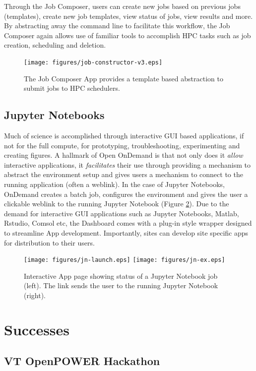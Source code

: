 \documentclass[runningheads]{llncs}
\begin{document}
\noindent Through the Job Composer, users can create new jobs based on previous jobs (templates), create new job templates, view status of jobs, view results and more.  By abstracting away the command line to facilitate this workflow, the Job Composer again allows use of familiar tools to accomplish HPC tasks such as job creation, scheduling and deletion.

\begin{figure}[H]
\centering 
\texttt{[image: figures/job-constructor-v3.eps]}
\caption{The Job Composer App provides a template based abstraction to submit jobs to HPC schedulers.} \label{fig-jobapp}
\end{figure}

\subsection{Jupyter Notebooks}

Much of science is accomplished through interactive GUI based applications, if not for the full compute, for prototyping, troubleshooting, experimenting and creating figures.  A hallmark of Open OnDemand is that not only does it \textit{allow} interactive applications, it \textit{facilitates} their use through providing a mechanism to abstract the environment setup and gives users a mechanism to connect to the running application (often a weblink).  In the case of Jupyter Notebooks, OnDemand creates a batch job, configures the environment and gives the user a clickable weblink to the running Jupyter Notebook (Figure \ref{fig-jnapp}).  Due to the demand for interactive GUI applications such as Jupyter Notebooks, Matlab, Rstudio, Comsol etc, the Dashboard comes with a plug-in style wrapper designed to streamline App development.  Importantly, sites can develop site specific apps for distribution to their users.

\begin{figure}[H]
\centering
\texttt{[image: figures/jn-launch.eps]}
\hfill %
\texttt{[image: figures/jn-ex.eps]}
\caption{Interactive App page showing status of a Jupyter Notebook job (left).  The link sends the user to the running Jupyter Notebook (right).} \label{fig-jnapp}
\end{figure}


\section{Successes}

\subsection{VT OpenPOWER Hackathon}
\end{document}
